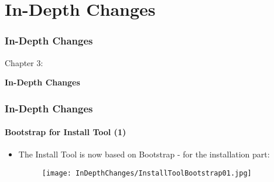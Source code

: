 %

\section{In-Depth Changes}
\begin{frame}[fragile]
	\frametitle{In-Depth Changes}

	\begin{center}\huge{Chapter 3:}\end{center}
	\begin{center}\huge{\color{typo3darkgrey}\textbf{In-Depth Changes}}\end{center}

\end{frame}


\begin{frame}[fragile]
	\frametitle{In-Depth Changes}
	\framesubtitle{Bootstrap for Install Tool (1)}

	\begin{itemize}

		\item The Install Tool is now based on Bootstrap - for the installation part:

			\begin{figure}
				\texttt{[image: InDepthChanges/InstallToolBootstrap01.jpg]}
			\end{figure}

	\end{itemize}

\end{frame}

